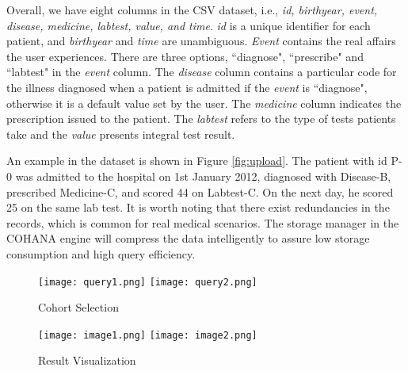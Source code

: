 Overall, we have eight columns in the CSV dataset, i.e., \emph{id, birthyear, event, disease, medicine, labtest, value, and time}. \emph{id} is a unique identifier for each patient, and \emph{birthyear} and \emph{time} are unambiguous. 
\emph{Event} contains the real affairs the user experiences.
There are three options, ``diagnose", ``prescribe" and ``labtest" in the \emph{event} column.
The \emph{disease} column contains a particular code for the illness diagnosed when a patient is admitted if the \emph{event} is ``diagnose", otherwise it is a default value set by the user.
The \emph{medicine} column indicates the prescription issued to the patient. %
The \emph{labtest} refers to the type of tests patients take and the \emph{value} presents integral test result. 

An example in the dataset is shown in Figure \ref{fig:upload}. The patient with id P-0 was admitted to the hospital on 1st January 2012, diagnosed with Disease-B, prescribed Medicine-C, and scored 44 on Labtest-C. On the next day, he scored 25 on the same lab test. 
It is worth noting that there exist redundancies in the records, which is common for real medical scenarios. 
The storage manager in the COHANA engine will compress the data intelligently to assure low storage consumption and high query efficiency.



\begin{figure}
    \texttt{[image: query1.png]}
    \texttt{[image: query2.png]}
    \vspace{-1em}
    \caption{Cohort Selection}
    \label{fig:cohort}
    \vspace{-1em}
\end{figure}
\begin{figure*}
    \texttt{[image: image1.png]}
    \vspace{-0.2em}
    \texttt{[image: image2.png]}
    \vspace{-1em}
    \caption{Result Visualization}
    \label{fig:visual}
    \vspace{-1em}
\end{figure*}

